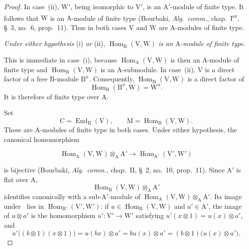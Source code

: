 \begin{proof}
In case~(ii), $\mathrm{W}'$, being isomorphic to $\mathrm{V}'$, is an
$\mathrm{A}'$-module of finite type. It follows that $\mathrm{W}$ is an
$\mathrm{A}$-module of finite type (Bourbaki, \emph{Alg.\ comm.},
chap.~I\textsuperscript{er}, \S~3, no.~6, prop.~11). Thus in both cases
$\mathrm{V}$ and $\mathrm{W}$ are $\mathrm{A}$-modules of finite type.

\begin{env}[2.5.8.1]
\label{IV.2.5.8.1}
\emph{Under either hypothesis} (i) \emph{or} (ii),
$\operatorname{Hom}_{\mathrm{B}}(\mathrm{V},\mathrm{W})$
\emph{is an $\mathrm{A}$-module of finite type.}
\end{env}

This is immediate in case~(i), because
$\operatorname{Hom}_{\mathrm{A}}(\mathrm{V},\mathrm{W})$ is then an
$\mathrm{A}$-module of finite type and
$\operatorname{Hom}_{\mathrm{B}}(\mathrm{V},\mathrm{W})$ is an
$\mathrm{A}$-submodule. In case~(ii), $\mathrm{V}$ is a direct factor
of a free $\mathrm{B}$-module $\mathrm{B}^n$. Consequently,
$\operatorname{Hom}_{\mathrm{B}}(\mathrm{V},\mathrm{W})$ is a direct
factor of
\[
  \operatorname{Hom}_{\mathrm{B}}(\mathrm{B}^n,\mathrm{W})
  =\mathrm{W}^n.
\]
It is therefore of finite type over $\mathrm{A}$.

Set
\[
  \mathrm{C}=\operatorname{End}_{\mathrm{B}}(\mathrm{V}),\qquad \mathrm{M}=\operatorname{Hom}_{\mathrm{B}}(\mathrm{V},\mathrm{W}).
\]
These are $\mathrm{A}$-modules of finite type in both cases. Under
either hypothesis, the canonical homomorphism

\begin{env}[2.5.8.2]
\label{IV.2.5.8.2}
\[
  \operatorname{Hom}_{\mathrm{A}}(\mathrm{V},\mathrm{W})\otimes_{\mathrm{A}}\mathrm{A}' \to \operatorname{Hom}_{\mathrm{A}'}(\mathrm{V}',\mathrm{W}')
\]
\end{env}

is bijective (Bourbaki, \emph{Alg.\ comm.}, chap.~II, \S~2, no.~10,
prop.~11). Since $\mathrm{A}'$ is flat over $\mathrm{A}$,
\[
  \operatorname{Hom}_{\mathrm{B}}(\mathrm{V},\mathrm{W})
  \otimes_{\mathrm{A}}\mathrm{A}'
\]
identifies canonically with a sub-$\mathrm{A}'$-module of
$\operatorname{Hom}_{\mathrm{A}}(\mathrm{V},\mathrm{W})
\otimes_{\mathrm{A}}\mathrm{A}'$. Its image under~
lies in $\operatorname{Hom}_{\mathrm{B}'}(\mathrm{V}',\mathrm{W}')$:
if $u\in\operatorname{Hom}_{\mathrm{B}}(\mathrm{V},\mathrm{W})$ and
$a'\in\mathrm{A}'$, the image of $u\otimes a'$ is the homomorphism
$u':\mathrm{V}'\to\mathrm{W}'$ satisfying
$u'(x\otimes1)=u(x)\otimes a'$, and
\[
  u'\bigl((b\otimes1)(x\otimes1)\bigr)
  =u(bx)\otimes a'
  =bu(x)\otimes a'
  =(b\otimes1)\bigl(u(x)\otimes a'\bigr).
\]


\end{proof}
